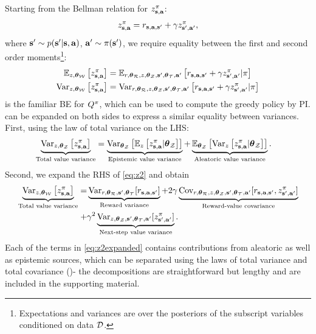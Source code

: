 \documentclass{article}
\begin{document}
\begin{appendices}
Starting from the Bellman relation for $\zb$:
\begin{align*}
\zb = \rsanb + \gamma \znb,
\end{align*}
where $\bm{s}' \sim p(\ns | \s, \ac)$, $\ac' \sim \pi(\ns)$, we require equality between the first and second order moments\footnote{Expectations and variances are over the posteriors of the subscript variables conditioned on data $\data$.}:
\begin{align}
\E_{z, \thetamcw} \sqb{\zb} &= \E_{r, \thetamcr, z, \thetamcz, \ns, \thetamct, \ac'} \sqb{\rsanb + \gamma \znb | \pi} \label{eq:z1} \\
\Var_{z, \thetamcw} \sqb{\zb} &= \Var_{r, \thetamcr, z, \thetamcz, \ns, \thetamct, \ac'} \sqb{\rsanb + \gamma \znb | \pi} \label{eq:z2}
\end{align}
 is the familiar BE for $\Q$, which can be used to compute the greedy policy by PI.  can be expanded on both sides to express a similar equality between variances. First, using the law of total variance on the LHS:
\begin{align*}
\underbrace{\Var_{z, \thetamcz} \sqb{\zb}}_{\text{Total value variance}} &= \underbrace{\Var_{\thetamcz} \sqb{\E_z\sqb{\zb | \thetamcz}}}_{\text{Epistemic value variance}} + \underbrace{\E_{\thetamcz} \sqb{\Var_z\sqb{\zb | \thetamcz}}}_{\text{Aleatoric value variance}}.
\end{align*}
Second, we expand the RHS of \cref{eq:z2} and obtain
\begin{align}
\underbrace{\Var_{z, \thetamcw} \sqb{\zb}}_{\text{Total value variance}} = &\underbrace{\Var_{r, \thetamcr, \ns, \thetamct}[\rsanb] }_{\text{Reward variance}} + 2\gamma \underbrace{\Cov_{r, \thetamcr, z, \thetamcz, \ns, \thetamct, \ac'}[\rsanb, \znb]}_{\text{Reward-value covariance}} \nonumber \\
+ & \gamma^2 \underbrace{\Var_{z, \thetamcz, \ns, \thetamct, \ac'}[\znb]}_{\text{Next-step value variance}}. \label{eq:z2expanded}
\end{align}
Each of the terms in \cref{eq:z2expanded} contains contributions from aleatoric as well as epistemic sources, which can be separated using the laws of total variance and total covariance (\cite{weiss})- the decompositions are straightforward but lengthy and are included in the supporting material.


\end{appendices}
\end{document}
